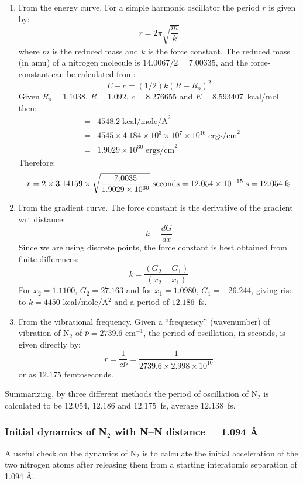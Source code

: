 \documentclass[11pt]{book}
\newcommand{\mi}[1]{#1\index{#1}}
\begin{document}
\begin{enumerate}
\item From the energy curve.
For a simple harmonic oscillator the period $r$ is given by:
$$ r = 2 \pi \sqrt{\frac{m}{k}}  $$
where $m$ is the \mi{reduced mass} and $k$ is the \mi{force constant}. 
The  reduced  mass  (in amu)   of   a   nitrogen  molecule  is  
$14.0067/2  =  7.00335$,  and  the force-constant can be calculated from:
$$                 E-c = (1/2) k(R-R_o)^2 $$
Given $R_o = 1.1038$, $R = 1.092$, $c = 8.276655$ and $E = 8.593407$~kcal/mol
then:
\begin{eqnarray*}                      
& = & 4548.2 \; \mbox{kcal/mole/A}^2 \\
& = & 4545 \times 4.184 \times 10^3 \times 10^7 \times 10^{16}\; 
\mbox{ergs/cm}^2 \\
& = & 1.9029 \times 10^{30} \; \mbox{ergs/cm}^2
\end{eqnarray*}
Therefore:      
$$ r = 2 \times 3.14159 \times \sqrt{\frac{7.0035}{1.9029\times 10^{30}}}
\;{\rm seconds} = 12.054 \times 10^{-15}\;{\rm s} = 12.054\;{\rm fs} $$

\item From the gradient curve.
The force  constant  is  the  derivative  of  the  gradient  wrt
distance:
$$ k = \frac{dG}{dx} $$
Since we are using discrete points,  the  force  constant  is  best
obtained from finite differences:
$$ k = \frac{(G_2-G_1)}{(x_2-x_1)} $$
For $x_2 = 1.1100$, $G_2 = 27.163$ and for $x_1 =  1.0980$,  
$G_1  =  -26.244$,
giving rise to $k = 4450$ kcal/mole/A$^2$ and a period of $12.186$~fs.

\item From the vibrational frequency.
Given a ``frequency'' (wavenumber) of vibration of N$_2$ of $\bar{\nu}=2739.6$  
cm$^{-1}$,  the period of oscillation, in seconds, is given directly by:
$$ r = \frac{1}{c\bar{\nu}} = \frac{1}{2739.6 \times 2.998 \times 10^{10}} 
$$
or as $12.175$ femtoseconds.
\end{enumerate}

Summarizing, by three different methods the period  of  oscillation
of N$_2$  is calculated to be $12.054$, $12.186$ and $12.175$~fs, average
$12.138$~fs.

\subsubsection{Initial dynamics of N$_2$ with N--N distance = 1.094 \AA}

A useful check on the dynamics of N$_2$ is to  calculate  the  initial
acceleration  of  the  two  nitrogen  atoms  after releasing them from a
starting interatomic separation of 1.094 \AA.
\end{document}
